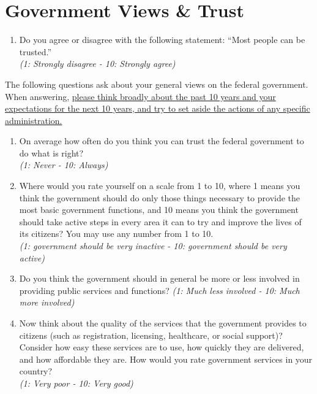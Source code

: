 \documentclass[11pt]{article}
\begin{document}
\section*{Government Views \& Trust}
\begin{enumerate}[resume]
    \item Do you agree or disagree with the following statement: “Most people can be trusted.” \\
    \textit{(1: Strongly disagree - 10: Strongly agree)}
\end{enumerate}
The following questions ask about your general views on the federal government. When answering, \uline{please think broadly about the past 10 years and your expectations for the next 10 years, and try to set aside the actions of any specific administration.}
\begin{enumerate}[resume]
    \item On average how often do you think you can trust the federal government to do what is right? \\ \textit{(1: Never - 10: Always)} 
    \item Where would you rate yourself on a scale from 1 to 10, where 1 means you think the government should do only those things necessary to provide the most basic government functions, and 10 means you think the government should take active steps in every area it can to try and improve the lives of its citizens? You may use any number from 1 to 10. \\\textit{(1: government should be very inactive - 10: government should be very active)}
    \item Do you think the government should in general be more or less involved in providing public services and functions?
    \textit{(1: Much less involved - 10: Much more involved)}
    \item Now think about the quality of the services that the government provides to citizens (such as registration, licensing, healthcare, or social support)? Consider how easy these services are to use, how quickly they are delivered, and how affordable they are. How would you rate government services in your country? \\
    \textit{(1: Very poor - 10: Very good)}
\end{enumerate}
\end{document}
